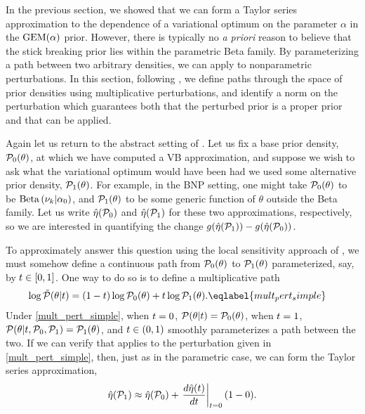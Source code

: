 In the previous section, we showed that we can form a Taylor series
approximation to the dependence of a variational optimum on the parameter
$\alpha$ in the $\mathrm{GEM}(\alpha)$ prior.  However, there is typically no {\em a priori} reason
to believe that the stick breaking prior lies within the parametric Beta family.
By parameterizing a path between two arbitrary densities, we can apply
 to nonparametric perturbations. In this section, following
\citet{gustafson:1996:local}, we define paths through the space of prior
densities using multiplicative perturbations, and identify a norm on the
perturbation which guarantees both that the perturbed prior is a proper prior
and that  can be applied.

Again let us return to the abstract setting of . Let us fix a
base prior density, $\mathcal{P}_{0}(\theta)$, at which we have computed a VB
approximation, and suppose we wish to ask what the variational optimum would
have been had we used some alternative prior density, $\mathcal{P}_{1}(\theta)$. For
example, in the BNP setting, one might take $\mathcal{P}_{0}(\theta)$ to be
$\mathrm{Beta}\left(\nu_{k} \vert \alpha_0\right)$, and $\mathcal{P}_{1}(\theta)$ to be some generic
function of $\theta$ outside the Beta family. Let us write $\hat\eta(\mathcal{P}_{0})$ and
$\hat\eta(\mathcal{P}_{1})$ for these two approximations, respectively, so we are
interested in quantifying the change $g(\hat\eta(\mathcal{P}_{1})) - g(\hat\eta(\mathcal{P}_{0}))$.

To approximately answer this question using the local sensitivity approach of
, we must somehow define a continuous path from
$\mathcal{P}_{0}(\theta)$ to $\mathcal{P}_{1}(\theta)$ parameterized, say, by $t \in [0, 1]$. One
way to do so is to define a multiplicative path
%
\begin{align}
%
\log \ptil(\theta \vert \t) ={}&
    (1 - \t)\log \pbase(\theta) + \t \log \palt(\theta).
        \eqlabel{mult_pert_simple}
%
\end{align}
%
Under \eqref{mult_pert_simple}, when $t=0$, $\mathcal{P}(\theta \vert t) =
\mathcal{P}_{0}(\theta)$, when $t=1$, $\mathcal{P}(\theta \vert t, \mathcal{P}_{0}, \mathcal{P}_{1}) =
\mathcal{P}_{1}(\theta)$, and $t \in (0,1)$ smoothly parameterizes a path between the
two.  If we can verify that  applies to the perturbation
given in \eqref{mult_pert_simple}, then, just as in the parametric case, we can
form the Taylor series approximation,
%
\begin{align*}
%
\etaopt(\palt) \approx
    \etaopt(\pbase) + \fracat{d \etaopt(\t)}{d\t}{\t=0} (1 - 0).
%
\end{align*}

